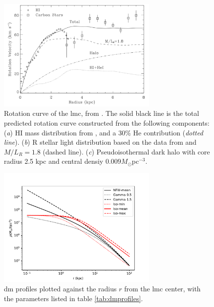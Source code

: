 \documentclass[main.tex]{subfiles}
\begin{document}
\begin{figure}
  \centering
  \includegraphics[width=0.7\textwidth]{Pictures/rotationcurvelmc.pdf}
  \caption{\label{fig:rotcurve} Rotation curve of the \gls{lmc}, from \cite{LMCHI}. The solid black line is the total predicted rotation curve constructed from the following components: (\textit{a}) HI mass distribution from \cite{1992gasLMC}, and a 30\% He contribution (\textit{dotted line}). (\textit{b}) R stellar light distribution based on the data from \cite{1958starsinLMC} and $M/L_{R}=1.8$ (dashed line). (\textit{c}) Pseudoisothermal dark halo with core radius 2.5 kpc and central densiy $0.009 M_{\odot}$pc$^{-3}$.}
\end{figure}

\begin{figure}
  \centering
  \includegraphics[width=0.7\textwidth]{Pictures/dmprofiles.pdf}
  \caption{\gls{dm} profiles plotted against the radius $r$ from the \gls{lmc} center, with the parameters listed in table \ref{tab:dmprofiles}.} \label{fig:dmprofiles}
\end{figure}
\end{document}

